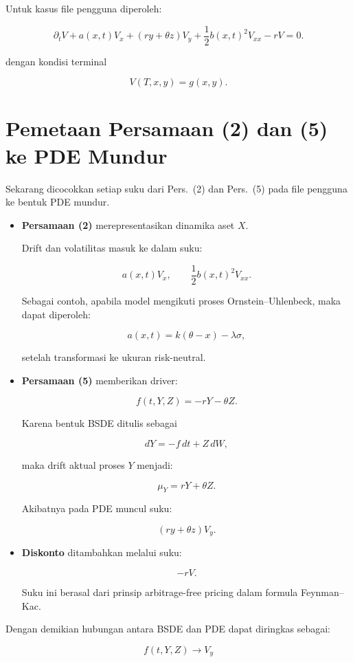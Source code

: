 \documentclass[12pt,a4paper]{article}
\begin{document}
Untuk kasus file pengguna diperoleh:

\begin{equation}
\partial_tV
+
a(x,t)V_x
+
(ry+\theta z)V_y
+
\frac12 b(x,t)^2V_{xx}
-rV
=
0.
\end{equation}

dengan kondisi terminal

\[
V(T,x,y)=g(x,y).
\]
\section{Pemetaan Persamaan (2) dan (5) ke PDE Mundur}

Sekarang dicocokkan setiap suku dari Pers.~(2) dan Pers.~(5) pada file pengguna ke bentuk PDE mundur.

\begin{itemize}
\item \textbf{Persamaan (2)} merepresentasikan dinamika aset $X$.

Drift dan volatilitas masuk ke dalam suku:

\[
a(x,t)V_x,
\qquad
\frac12 b(x,t)^2V_{xx}.
\]

Sebagai contoh, apabila model mengikuti proses Ornstein--Uhlenbeck, maka dapat diperoleh:

\[
a(x,t)=k(\theta-x)-\lambda\sigma,
\]

setelah transformasi ke ukuran risk-neutral.

\item \textbf{Persamaan (5)} memberikan driver:

\[
f(t,Y,Z)=-rY-\theta Z.
\]

Karena bentuk BSDE ditulis sebagai

\[
dY=-f\,dt+Z\,dW,
\]

maka drift aktual proses $Y$ menjadi:

\[
\mu_Y=rY+\theta Z.
\]

Akibatnya pada PDE muncul suku:

\[
(ry+\theta z)V_y.
\]

\item \textbf{Diskonto} ditambahkan melalui suku:

\[
-rV.
\]

Suku ini berasal dari prinsip arbitrage-free pricing dalam formula Feynman--Kac.
\end{itemize}

Dengan demikian hubungan antara BSDE dan PDE dapat diringkas sebagai:

\[
f(t,Y,Z)
\longrightarrow
V_y
\]
\end{document}
